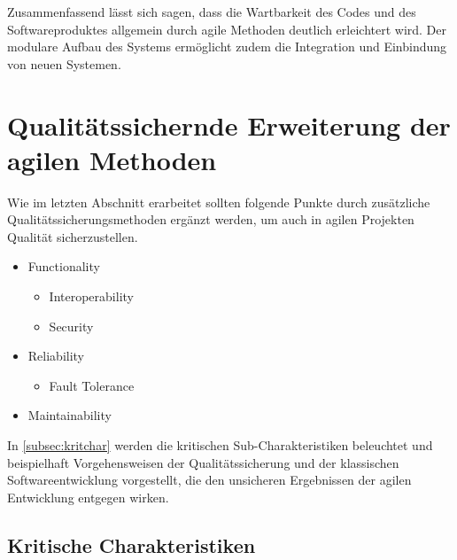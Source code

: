            Zusammenfassend lässt sich sagen, dass die Wartbarkeit des Codes und des Softwareproduktes allgemein durch agile Methoden deutlich erleichtert wird. Der modulare Aufbau des Systems ermöglicht zudem die Integration und Einbindung von neuen Systemen.

    \section{Qualitätssichernde Erweiterung der agilen Methoden}


        Wie im letzten Abschnitt erarbeitet sollten folgende Punkte durch zusätzliche Qualitätssicherungsmethoden ergänzt werden, um auch in agilen Projekten Qualität sicherzustellen.

        \begin{itemize}
          \item Functionality
            \begin{itemize}
              \item Interoperability
              \item Security
            \end{itemize}
          \item Reliability
            \begin{itemize}
              \item Fault Tolerance
            \end{itemize}
          \item Maintainability
        \end{itemize}

        In \autoref{subsec:kritchar} werden die kritischen Sub-Charakteristiken beleuchtet und beispielhaft Vorgehensweisen der Qualitätssicherung und der klassischen Softwareentwicklung vorgestellt, die den unsicheren Ergebnissen der agilen Entwicklung entgegen wirken.

        \subsection{Kritische Charakteristiken}
        \label{subsec:kritchar}

